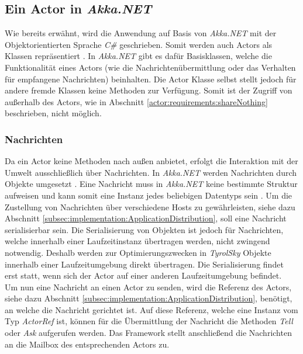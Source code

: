 \subsection{Ein Actor in \textit{Akka.NET}}
Wie bereits erwähnt, wird die Anwendung auf Basis von \textit{Akka.NET} mit der Objektorientierten Sprache \textit{C\#} geschrieben. Somit werden auch Actors als Klassen repräsentiert \citep{Akka.NETCommunityAkka.NETDocumentation}. In \textit{Akka.NET} gibt es dafür Basisklassen, welche die Funktionalität eines Actors (wie die Nachrichtenübermittlung oder das Verhalten für empfangene Nachrichten) beinhalten. Die Actor Klasse selbst stellt jedoch für andere fremde Klassen keine Methoden zur Verfügung. Somit ist der Zugriff von außerhalb des Actors, wie in Abschnitt \ref{actor:requirements:shareNothing} beschrieben, nicht möglich. 

\subsubsection{Nachrichten}\label{subsec:implementation:akkaMessaging}
Da ein Actor keine Methoden nach außen anbietet, erfolgt die Interaktion mit der Umwelt ausschließlich über Nachrichten. In \textit{Akka.NET} werden Nachrichten durch Objekte umgesetzt \citep{akkaInAction}. Eine Nachricht muss in \textit{Akka.NET} keine bestimmte Struktur aufweisen und kann somit eine Instanz jedes beliebigen Datentyps sein \citep{akkaInAction}. Um die Zustellung von Nachrichten über verschiedene Hosts zu gewährleisten, siehe dazu Abschnitt \ref{subsec:implementation:ApplicationDistribution}, soll eine Nachricht serialisierbar sein. Die Serialisierung von Objekten ist jedoch für Nachrichten, welche innerhalb einer Laufzeitinstanz übertragen werden, nicht zwingend notwendig. Deshalb werden zur Optimierungszwecken in \textit{TyrolSky} Objekte innerhalb einer Laufzeitumgebung direkt übertragen. Die Serialisierung findet erst statt, wenn sich der Actor auf einer anderen Laufzeitumgebung befindet. \\
Um nun eine Nachricht an einen Actor zu senden, wird die Referenz des Actors, siehe dazu Abschnitt \ref{subsec:implementation:ApplicationDistribution}, benötigt, an welche die Nachricht gerichtet ist. Auf diese Referenz, welche eine Instanz vom Typ \textit{ActorRef} ist, können für die Übermittlung der Nachricht die Methoden \textit{Tell} oder \textit{Ask} aufgerufen werden. Das Framework stellt anschließend die Nachrichten an die Mailbox des entsprechenden Actors zu.

